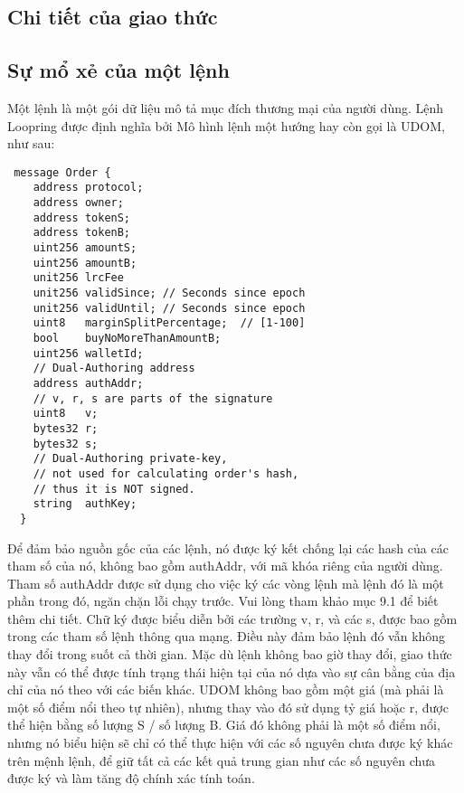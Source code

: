\documentclass[12pt,a4paper]{article}
\begin{document}
\begin{multicols}{2}
\section{Chi tiết của giao thức\label{sec:protocol}}
\subsection{Sự mổ xẻ của một lệnh\label{anatomy}}
Một lệnh là một gói dữ liệu mô tả mục đích thương mại của người dùng. Lệnh Loopring được định nghĩa bởi Mô hình lệnh một hướng hay còn gọi là UDOM, như sau:
\begin{small}
\begin{verbatim}
 message Order {
    address protocol;
    address owner;
    address tokenS;
    address tokenB;
    uint256 amountS;
    uint256 amountB;
    unit256 lrcFee
    unit256 validSince; // Seconds since epoch
    unit256 validUntil; // Seconds since epoch
    uint8   marginSplitPercentage;  // [1-100]
    bool    buyNoMoreThanAmountB;
    uint256 walletId;
    // Dual-Authoring address
    address authAddr;
   	// v, r, s are parts of the signature
    uint8   v;
    bytes32 r;
    bytes32 s;
    // Dual-Authoring private-key,
    // not used for calculating order's hash,
    // thus it is NOT signed.
    string  authKey;
  }
\end{verbatim}
\end{small}
Để đảm bảo nguồn gốc của các lệnh, nó được ký kết chống lại các hash của các tham số của nó, không bao gồm authAddr, với mã khóa riêng của người dùng. Tham số authAddr được sử dụng cho việc ký các vòng lệnh mà lệnh đó là một phần trong đó, ngăn chặn lỗi chạy trước. Vui lòng tham khảo mục 9.1 để biết thêm chi tiết. Chữ ký được biểu diễn bởi các trường v, r, và các s, được bao gồm trong các tham số lệnh thông qua mạng. Điều này đảm bảo lệnh đó vẫn không thay đổi trong suốt cả thời gian. Mặc dù lệnh không bao giờ thay đổi, giao thức này vẫn có thể được tính trạng thái hiện tại của nó dựa vào sự cân bằng của địa chỉ của nó theo với các biến khác.
UDOM không bao gồm một giá (mà phải là một số điểm nổi theo tự nhiên), nhưng thay vào đó sử dụng tỷ giá hoặc r, được thể hiện bằng số lượng S / số lượng B. Giá đó không phải là một số điểm nổi, nhưng nó biểu hiện sẽ chỉ có thể thực hiện với các số nguyên chưa được ký khác trên mệnh lệnh, để giữ tất cả các kết quả trung gian như các số nguyên chưa được ký và làm tăng độ chính xác tính toán.


\end{multicols}
\end{document}
